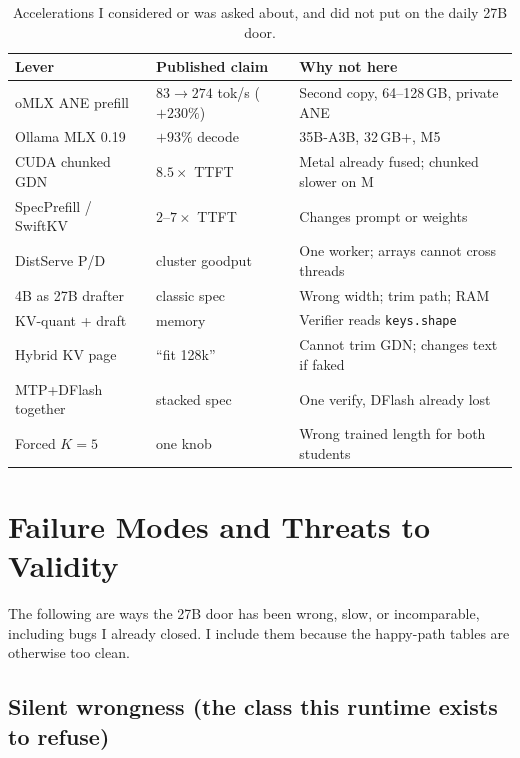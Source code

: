 \begin{table}[t]
\centering
\caption{Accelerations I considered or was asked about, and did not put on the daily 27B door.}
\label{tab:non}
\begin{tabular}{@{}p{3.4cm}p{4.2cm}p{5.6cm}@{}}
\toprule
Lever & Published claim & Why not here \\
\midrule
oMLX ANE prefill & $83{\to}274$ tok/s (${+}230\%$) & Second copy, 64--128\,GB, private ANE \\
Ollama MLX 0.19 & ${+}93\%$ decode & 35B-A3B, 32\,GB+, M5 \\
CUDA chunked GDN & $8.5\times$ TTFT & Metal already fused; chunked slower on M \\
SpecPrefill / SwiftKV & $2$--$7\times$ TTFT & Changes prompt or weights \\
DistServe P/D & cluster goodput & One worker; arrays cannot cross threads \\
4B as 27B drafter & classic spec & Wrong width; trim path; RAM \\
KV-quant + draft & memory & Verifier reads \texttt{keys.shape} \\
Hybrid KV page & ``fit 128k'' & Cannot trim GDN; changes text if faked \\
MTP+DFlash together & stacked spec & One verify, DFlash already lost \\
Forced $K{=}5$ & one knob & Wrong trained length for both students \\
\bottomrule
\end{tabular}
\end{table}

\section{Failure Modes and Threats to Validity}
\label{sec:threats}

The following are ways the 27B door has been wrong, slow, or incomparable, including bugs I already closed. I include them because the happy-path tables are otherwise too clean.

\subsection{Silent wrongness (the class this runtime exists to refuse)}

